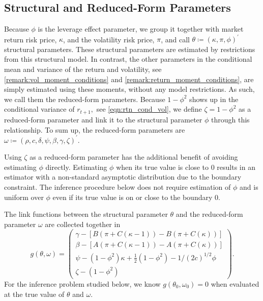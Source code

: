 \documentclass[11pt, letterpaper, twoside]{article}
\begin{document}
\subsection{Structural and Reduced-Form Parameters}

Because $\phi$ is the leverage effect parameter, we group it together with market return risk price, $\kappa$, and the volatility risk price, $\pi$, and call $ \theta \coloneqq (\kappa ,\pi ,\phi )^{\prime}$ structural parameters. These structural parameters are estimated by restrictions from this structural model. In contrast, the other parameters in the conditional mean and variance of the return and volatility, see \cref{remark:vol_moment_conditions} and \cref{remark:return_moment_conditions}, are simply estimated using these moments, without any model restrictions. As such, we call them the reduced-form parameters. Because $1-\phi ^{2}$ shows up in the conditional variance of $r_{t+1},$ see \cref{eqn:rtn_cond_vol}, we define $\zeta =1-\phi ^{2}$ as a reduced-form parameter and link it to the structural parameter $\phi$ through this relationship. To sum up, the reduced-form parameters are $\omega \coloneqq (\rho, c,\delta, \psi, \beta, \gamma, \zeta )^{\prime }$.

Using $\zeta $ as a reduced-form parameter has the additional benefit of avoiding estimating $\phi$ directly. Estimating $\phi $ when its true value is close to 0 results in an estimator with a non-standard asymptotic distribution due to the boundary constraint. The inference procedure below does not require estimation of $\phi$ and is uniform over $\phi$ even if its true value is on or close to the boundary $0$.

The link functions between the structural parameter $\theta$ and the reduced-form parameter $\omega $ are collected together in
%
\begin{equation}
   g(\theta, \omega) = 
%
    \begin{pmatrix}
        \gamma - [B\left( \pi +C\left( \kappa -1\right) \right) -B\left( \pi +C\left( \kappa \right) \right)] \\ 
        \beta - [A\left( \pi +C\left( \kappa -1\right) \right) -A\left( \pi +C\left( \kappa \right) \right)] \\ 
        \psi -(1-\phi ^{2})\kappa +\frac{1}{2}(1-\phi ^{2})-1/(2c)^{1/2}\phi  \\ \zeta -\left( 1-\phi ^{2}\right) 
    \end{pmatrix}.
\end{equation}%
%
For the inference problem studied below, we know $g(\theta _{0},\omega_{0})=0$ when evaluated at the true value of $\theta $ and $\omega .$
\end{document}
